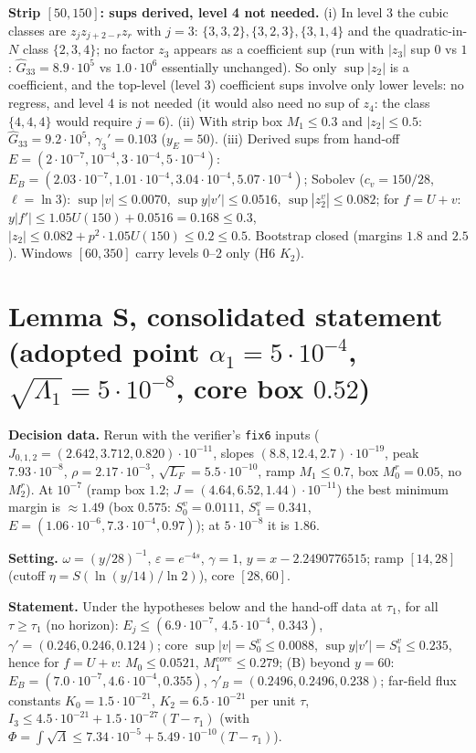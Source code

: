 \documentclass[11pt]{article}
\begin{document}
\textbf{Strip $[50,150]$: sups derived, level 4 not needed.} (i) In level 3 the cubic classes are $z_jz_{j+2-r}z_r$ with $j=3$: $\{3,3,2\},\{3,2,3\},\{3,1,4\}$ and the quadratic-in-$N$ class $\{2,3,4\}$; no factor $z_3$ appears as a coefficient sup (run with $|z_3|$ sup $0$ vs $1$: $\hat G_{33}=8.9\cdot10^5$ vs $1.0\cdot10^6$ essentially unchanged). So only $\sup|z_2|$ is a coefficient, and the top-level (level 3) coefficient sups involve only lower levels: no regress, and level 4 is not needed (it would also need no sup of $z_4$: the class $\{4,4,4\}$ would require $j=6$). (ii) With strip box $M_1\le0.3$ and $|z_2|\le0.5$: $\hat G_{33}=9.2\cdot10^5$, $\gamma_3'=0.103$ ($y_E=50$). (iii) Derived sups from hand-off $E=(2\cdot10^{-7},10^{-4},3\cdot10^{-4},5\cdot10^{-4})$: $E_B=(2.03\cdot10^{-7},1.01\cdot10^{-4},3.04\cdot10^{-4},5.07\cdot10^{-4})$; Sobolev ($c_v=150/28$, $\ell=\ln3$): $\sup|v|\le0.0070$, $\sup y|v'|\le0.0516$, $\sup|z_2^v|\le0.082$; for $f=U+v$: $y|f'|\le1.05U(150)+0.0516=0.168\le0.3$, $|z_2|\le0.082+p^2\cdot1.05U(150)\le0.2\le0.5$. Bootstrap closed (margins $1.8$ and $2.5$). Windows $[60,350]$ carry levels 0--2 only (H6 $K_2$).

\section*{Lemma S, consolidated statement (adopted point $\alpha_1=5\cdot10^{-4}$, $\sqrt{\Lambda_1}=5\cdot10^{-8}$, core box $0.52$)}
\textbf{Decision data.} Rerun with the verifier's \texttt{fix6} inputs ($J_{0,1,2}=(2.642,3.712,0.820)\cdot10^{-11}$, slopes $(8.8,12.4,2.7)\cdot10^{-19}$, peak $7.93\cdot10^{-8}$, $\rho=2.17\cdot10^{-3}$, $\sqrt{L_F}=5.5\cdot10^{-10}$, ramp $M_1\le0.7$, box $M_0^{r}=0.05$, no $M_2^r$). At $10^{-7}$ (ramp box $1.2$; $J=(4.64,6.52,1.44)\cdot10^{-11}$) the best minimum margin is $\approx1.49$ (box $0.575$: $S_0^v=0.0111$, $S_1^v=0.341$, $E=(1.06\cdot10^{-6},7.3\cdot10^{-4},0.97)$); at $5\cdot10^{-8}$ it is $1.86$.

\textbf{Setting.} $\omega=(y/28)^{-1}$, $\varepsilon=e^{-4s}$, $\gamma=1$, $y=x-2.2490776515$; ramp $[14,28]$ (cutoff $\eta=S(\ln(y/14)/\ln2)$), core $[28,60]$.

\textbf{Statement.} Under the hypotheses below and the hand-off data at $\tau_1$, for all $\tau\ge\tau_1$ (no horizon): $E_j\le(6.9\cdot10^{-7},\,4.5\cdot10^{-4},\,0.343)$, $\gamma'=(0.246,0.246,0.124)$; core $\sup|v|=S_0^v\le0.0088$, $\sup y|v'|=S_1^v\le0.235$, hence for $f=U+v$: $M_0\le0.0521$, $M_1^{core}\le0.279$; (B) beyond $y=60$: $E_B=(7.0\cdot10^{-7},4.6\cdot10^{-4},0.355)$, $\gamma'_B=(0.2496,0.2496,0.238)$; far-field flux constants $K_0=1.5\cdot10^{-21}$, $K_2=6.5\cdot10^{-21}$ per unit $\tau$, $I_3\le4.5\cdot10^{-21}+1.5\cdot10^{-27}(T-\tau_1)$ (with $\Phi=\int\sqrt\Lambda\le7.34\cdot10^{-5}+5.49\cdot10^{-10}(T-\tau_1)$).
\end{document}
